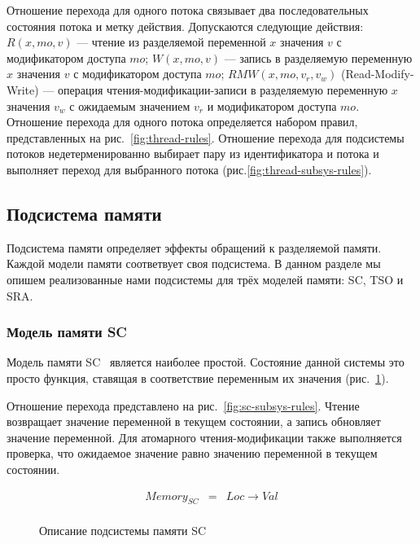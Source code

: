 Отношение перехода для одного потока 
связывает два последовательных состояния потока и метку действия.
Допускаются следующие действия: 
$R(x, mo, v)$ --- чтение из разделяемой переменной $x$ 
значения $v$ с модификатором доступа $mo$;
$W(x, mo, v)$ --- запись в разделяемую переменную $x$
значения $v$ с модификатором доступа $mo$;
$RMW(x, mo, v_r, v_w)$ (Read-Modify-Write) --- операция чтения-модификации-записи
в разделяемую переменную $x$ значения $v_w$ с ожидаемым значением $v_r$
и модификатором доступа $mo$. 
Отношение перехода для одного потока 
определяется набором правил, представленных на рис.~\ref{fig:thread-rules}.
Отношение перехода для подсистемы потоков недетерменированно 
выбирает пару из идентификатора и потока и выполняет переход 
для выбранного потока (рис.\ref{fig:thread-subsys-rules}).

\subsection{Подсистема памяти}

Подсистема памяти определяет эффекты обращений к разделяемой памяти.
Каждой модели памяти соответвует своя подсистема.
В данном разделе мы опишем реализованные нами подсистемы
для трёх моделей памяти: SC, TSO и SRA.

\subsubsection{Модель памяти SC}

Модель памяти SC~\cite{lamport1979make} является наиболее простой. 
Состояние данной системы это просто функция,
ставящая в соответствие переменным их значения (рис.~\ref{fig:sc-subsys-def}).

Отношение перехода представлено на рис.~\ref{fig:sc-subsys-rules}.
Чтение возвращает значение переменной в текущем состоянии, 
а запись обновляет значение переменной.
Для атомарного чтения-модификации также выполняется проверка, 
что ожидаемое значение равно значению переменной в текущем состоянии.

\begin{figure}[hbt]
\begin{minipage}{\linewidth}

\[
\begin{array}{rcl}
Memory_{SC}      & = &   Loc \rightarrow Val     \\
\end{array}
\]

\end{minipage}
\caption{Описание подсистемы памяти SC}
\label{fig:sc-subsys-def}
\end{figure}


